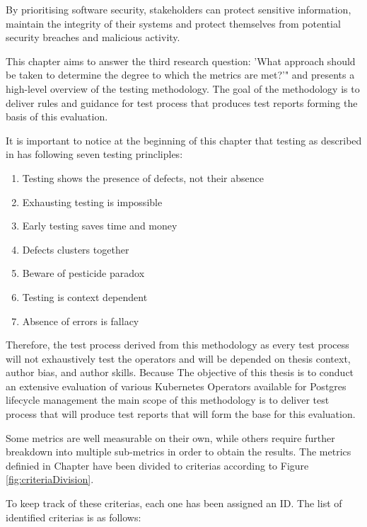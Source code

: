 By prioritising software security, stakeholders can protect sensitive information, maintain the integrity of their systems and protect themselves from potential security breaches and malicious activity.


This chapter aims to answer the third research question: 'What approach should be taken to determine the degree to which the metrics are
met?'" and presents a high-level overview of the testing methodology. The goal of the methodology is to deliver rules and guidance for test process that produces test reports forming the basis of this evaluation.

It is important to notice at the beginning of this chapter that testing as described in \cite{FoundationOfSoftwareTesting} has following seven testing princliples:
\begin{enumerate}
    \item Testing shows the presence of defects, not their absence
    \item Exhausting testing is impossible
    \item Early testing saves time and money
    \item Defects clusters together
    \item Beware of pesticide paradox
    \item Testing is context dependent
    \item Absence of errors is fallacy
\end{enumerate}



Therefore, the test process derived from this methodology as every test process will not exhaustively test the operators and will be depended on thesis context, author bias, and author skills. Because The objective of this thesis is to conduct an extensive evaluation of various Kubernetes
Operators available for Postgres lifecycle management the main scope of this methodology is to deliver test process that will produce test reports that will form the base for this evaluation.

Some metrics are well measurable on their own, while others require further breakdown into multiple sub-metrics in order to obtain the results.
The metrics definied in Chapter  have been divided to criterias according to Figure \ref{fig:criteriaDivision}.

To keep track of these criterias, each one has been assigned an ID. The list of identified criterias is as follows:

